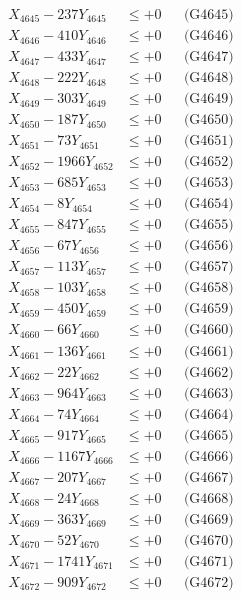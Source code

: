 \documentclass[a4paper,10pt]{article}
\begin{document}
{\begin{align}
X_{4645} - 237Y_{4645} &\leq +0 && \text{(G4645)} \\
X_{4646} - 410Y_{4646} &\leq +0 && \text{(G4646)} \\
X_{4647} - 433Y_{4647} &\leq +0 && \text{(G4647)} \\
X_{4648} - 222Y_{4648} &\leq +0 && \text{(G4648)} \\
X_{4649} - 303Y_{4649} &\leq +0 && \text{(G4649)} \\
X_{4650} - 187Y_{4650} &\leq +0 && \text{(G4650)} \\
\allowbreak
X_{4651} - 73Y_{4651} &\leq +0 && \text{(G4651)} \\
X_{4652} - 1966Y_{4652} &\leq +0 && \text{(G4652)} \\
X_{4653} - 685Y_{4653} &\leq +0 && \text{(G4653)} \\
X_{4654} - 8Y_{4654} &\leq +0 && \text{(G4654)} \\
X_{4655} - 847Y_{4655} &\leq +0 && \text{(G4655)} \\
X_{4656} - 67Y_{4656} &\leq +0 && \text{(G4656)} \\
X_{4657} - 113Y_{4657} &\leq +0 && \text{(G4657)} \\
X_{4658} - 103Y_{4658} &\leq +0 && \text{(G4658)} \\
X_{4659} - 450Y_{4659} &\leq +0 && \text{(G4659)} \\
X_{4660} - 66Y_{4660} &\leq +0 && \text{(G4660)} \\
\allowbreak
X_{4661} - 136Y_{4661} &\leq +0 && \text{(G4661)} \\
X_{4662} - 22Y_{4662} &\leq +0 && \text{(G4662)} \\
X_{4663} - 964Y_{4663} &\leq +0 && \text{(G4663)} \\
X_{4664} - 74Y_{4664} &\leq +0 && \text{(G4664)} \\
X_{4665} - 917Y_{4665} &\leq +0 && \text{(G4665)} \\
X_{4666} - 1167Y_{4666} &\leq +0 && \text{(G4666)} \\
X_{4667} - 207Y_{4667} &\leq +0 && \text{(G4667)} \\
X_{4668} - 24Y_{4668} &\leq +0 && \text{(G4668)} \\
X_{4669} - 363Y_{4669} &\leq +0 && \text{(G4669)} \\
X_{4670} - 52Y_{4670} &\leq +0 && \text{(G4670)} \\
\allowbreak
X_{4671} - 1741Y_{4671} &\leq +0 && \text{(G4671)} \\
X_{4672} - 909Y_{4672} &\leq +0 && \text{(G4672)} \\

\end{align}}
\end{document}
